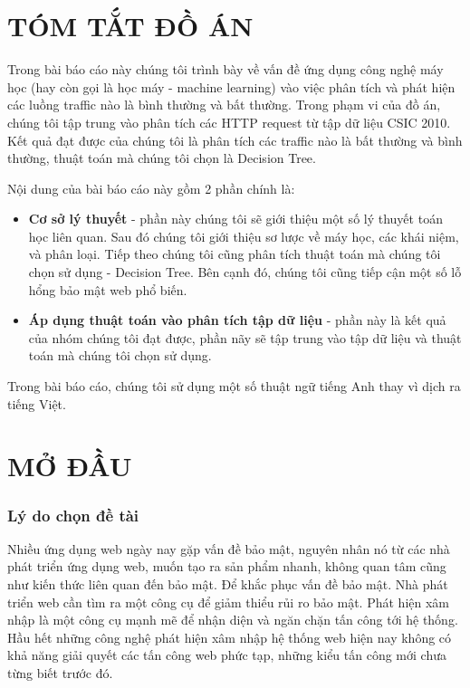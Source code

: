 \documentclass[../main-report.tex]{subfiles}
\begin{document}
\part*{TÓM TẮT ĐỒ ÁN}
Trong bài báo cáo này chúng tôi trình bày về vấn đề ứng dụng công nghệ máy học (hay còn gọi là học máy - machine learning) vào việc phân tích và phát hiện các luồng traffic nào là bình thường và bất thường. Trong phạm vi của đồ án, chúng tôi tập trung vào phân tích các HTTP request từ tập dữ liệu CSIC 2010. Kết quả đạt được của chúng tôi là phân tích các traffic nào là bất thường và bình thường, thuật toán mà chúng tôi chọn là Decision Tree.

Nội dung của bài báo cáo này gồm 2 phần chính là:

\begin{itemize}
\item \textbf{Cơ sở lý thuyết} - phần này chúng tôi sẽ giới thiệu một số lý thuyết toán học liên quan. Sau đó chúng tôi giới thiệu sơ lược về máy học, các khái niệm, và phân loại. Tiếp theo chúng tôi cũng phân tích thuật toán mà chúng tôi chọn sử dụng - Decision Tree. Bên cạnh đó, chúng tôi cũng tiếp cận một số lỗ hổng bảo mật web phổ biến.
\item \textbf{Áp dụng thuật toán vào phân tích tập dữ liệu} - phần này là kết quả của nhóm chúng tôi đạt được, phần nãy sẽ tập trung vào tập dữ liệu và thuật toán mà chúng tôi chọn sử dụng.
\end{itemize}

Trong bài báo cáo, chúng tôi sử dụng một số thuật ngữ tiếng Anh thay vì dịch ra tiếng Việt.
\newpage
\part*{MỞ ĐẦU}
\section*{Lý do chọn đề tài}
Nhiều ứng dụng web ngày nay gặp vấn đề bảo mật, nguyên nhân nó từ các nhà phát triển ứng dụng web, muốn tạo ra sản phẩm nhanh, không quan tâm cũng như kiến thức liên quan đến bảo mật. Để khắc phục vấn đề bảo mật. Nhà phát triển web cần tìm ra một công cụ để giảm thiểu rủi ro bảo mật. Phát hiện xâm nhập là một công cụ mạnh mẽ để nhận diện và ngăn chặn tấn công tới hệ thống. Hầu hết những công nghệ phát hiện xâm nhập hệ thống web hiện nay không có khả năng giải quyết các tấn công web phức tạp, những kiểu tấn công mới chưa từng biết trước đó.
\end{document}
